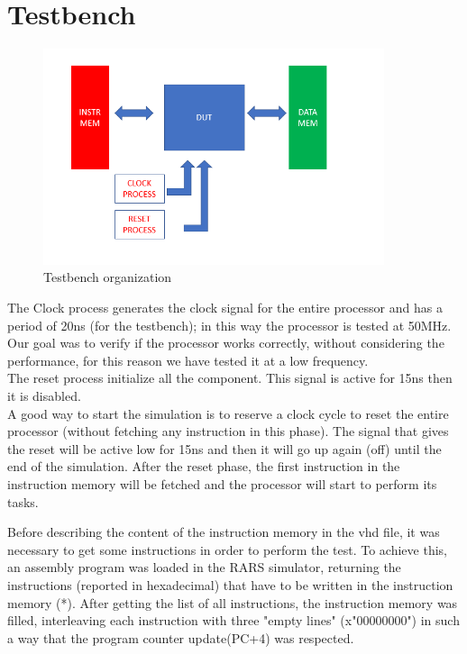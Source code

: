 \chapter{Testbench}
\begin{figure}[h!]
	\centering
	\includegraphics[width=10cm]{./images/Testbench}
	\caption{Testbench organization}
	\label{fig4.1}
\end{figure} 
The Clock process generates the clock signal for the entire processor and has a period of 20ns (for the testbench); in this way the processor is tested at 50MHz. \\
Our goal was to verify if the processor works correctly, without considering the performance, for this reason we have tested it at a low frequency.\\
The reset process initialize all the component. This signal is active for 15ns then it is disabled.\\
A good way to start the simulation is to reserve a clock cycle to reset the entire processor (without fetching any instruction in this phase). The signal that gives the reset will be active low for 15ns and then it will go up again (off) until the end of the simulation. After the reset phase, the first instruction in the instruction memory will be fetched and the processor will start to perform its tasks.

Before describing the content of the instruction memory in the vhd file, it was necessary to get some instructions in order to perform the test.
To achieve this, an assembly program was loaded in the RARS simulator, returning the instructions (reported in hexadecimal) that have to be written in the instruction memory (*).
After getting the list of all instructions, the instruction memory was filled, interleaving each instruction with three "empty lines" (x"00000000")  in such a way that the program counter update(PC+4) was respected.\\

